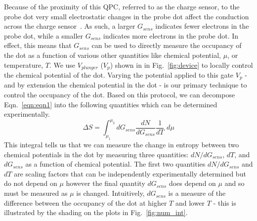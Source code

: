 Because of the proximity of this QPC, referred to as the charge sensor, to the probe dot very small electrostatic changes in the probe dot affect the conduction across the charge sensor~\cite{spintocharge}. As such, a larger $G_{sens}$ indicates fewer electrons in the probe dot, while a smaller $G_{sens}$ indicates more electrons in the probe dot. In effect, this means that $G_{sens}$ can be used to directly measure the occupancy of the dot as a function of various other quantities like chemical potential, $\mu$, or temperature, $T$. We use $V_{plunger}$ ($V_p$) shown in in Fig.~\ref{fig:device} to locally control the chemical potential of the dot. Varying the potential applied to this gate $V_p$ - and by extension the chemical potential in the dot - is our primary technique to control the occupancy of the dot. Based on this protocol, we can decompose Eqn.~\ref{eqn:eqn1} into the following quantities which can be determined experimentally.
\begin{equation}
	\label{eqn:eqn2}
	\Delta S = \int_{\mu_1}^{\mu_2} d G_{sens}\frac{dN}{dG_{sens}} \frac{1}{dT} \,\,  d \mu
\end{equation}
This integral tells us that we can measure the change in entropy between two chemical potentials in the dot by measuring three quantities: $dN/dG_{sens}$, $dT$, and $dG_{sens}$ as a function of chemical potential. The first two quantities $dN/dG_{sens}$ and $dT$ are scaling factors that can be independently experimentally determined but do not depend on $\mu$ however the final quantity $dG_{sens}$ does depend on $\mu$ and so must be measured as $\mu$ is changed. Intuitively, $dG_{sens}$ is a measure of the difference between the occupancy of the dot at higher $T$ and lower $T$ - this is illustrated by the shading on the plots in Fig.~\ref{fig:num_int}. 


